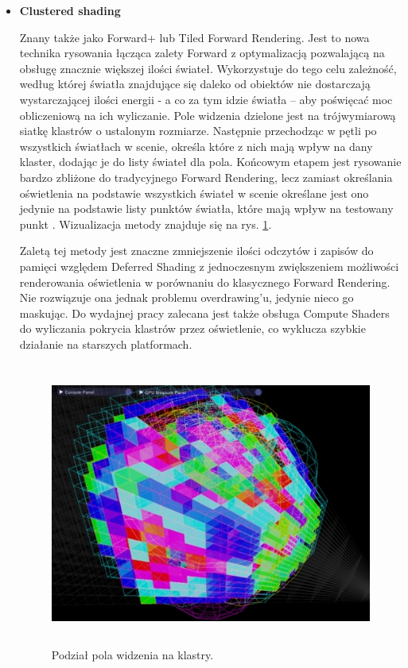 \begin{itemize}
	\item \textbf{Clustered shading}

	Znany także jako Forward+ lub Tiled Forward Rendering. Jest to nowa technika rysowania łącząca zalety Forward z optymalizacją pozwalającą na obsługę znacznie większej ilości świateł. Wykorzystuje do tego celu zależność, według której światła znajdujące się daleko od obiektów nie dostarczają wystarczającej ilości energii - a co za tym idzie światła -- aby poświęcać moc obliczeniową na ich wyliczanie. Pole widzenia dzielone jest na trójwymiarową siatkę klastrów o ustalonym rozmiarze. Następnie przechodząc w pętli po wszystkich światłach w scenie, określa które z nich mają wpływ na dany klaster, dodając je do listy świateł dla pola. Końcowym etapem jest rysowanie bardzo zbliżone do tradycyjnego Forward Rendering, lecz zamiast określania oświetlenia na podstawie wszystkich świateł w scenie określane jest ono jedynie na podstawie listy punktów światła, które mają wpływ na testowany punkt \cite{aortiz:clustered:2024}. Wizualizacja metody znajduje się na rys. \ref{intro-clustered-rendering}.

	Zaletą tej metody jest znaczne zmniejszenie ilości odczytów i zapisów do pamięci względem Deferred Shading z jednoczesnym zwiększeniem możliwości renderowania oświetlenia w porównaniu do klasycznego Forward Rendering. Nie rozwiązuje ona jednak problemu overdrawing'u, jedynie nieco go maskując. Do wydajnej pracy zalecana jest także obsługa Compute Shaders do wyliczania pokrycia klastrów przez oświetlenie, co wyklucza szybkie działanie na starszych platformach.

	\begin{figure}[htbp]
		\centering
		\includegraphics[width=4.94167in,height=3.67203in]{images/2_clustered_field.png}
		\caption{Podział pola widzenia na klastry. \cite{cnblogs:clustered:2024}}
		\label{intro-clustered-rendering}
	\end{figure}


\end{itemize}
